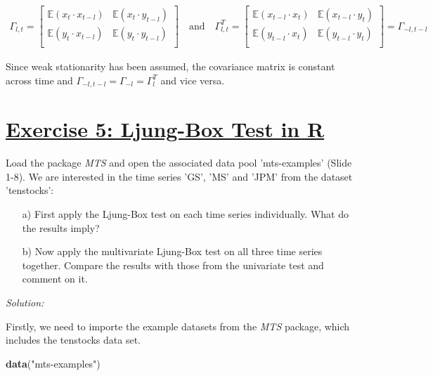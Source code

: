 \documentclass[12pt,a4paper]{article}
\newcommand{\tmpsection}[1]{}
\let\tmpsection=\section
\renewcommand{\section}[1]{\tmpsection{\underline{#1}} }
\newenvironment{Shaded}{\begin{snugshade}}{\end{snugshade}}
\newcommand{\KeywordTok}[1]{\textcolor[rgb]{0.13,0.29,0.53}{\textbf{#1}}}
\newcommand{\NormalTok}[1]{#1}
\newcommand{\StringTok}[1]{\textcolor[rgb]{0.31,0.60,0.02}{#1}}
\begin{document}
\begin{align*}
\Gamma_{l,t} = 
\begin{bmatrix}
  \mathbb{E}(x_t \cdot x_{t-l}) & \mathbb{E}(x_t \cdot y_{t-l}) \\
  \mathbb{E}(y_t \cdot x_{t-l}) & \mathbb{E}(y_t \cdot y_{t-l}) \\
\end{bmatrix}
\quad \text{and} \quad 
\Gamma_{l,t}^{T} = 
\begin{bmatrix}
  \mathbb{E}(x_{t-l} \cdot x_t ) & \mathbb{E}(x_{t-l} \cdot y_t) \\
  \mathbb{E}(y_{t-l} \cdot x_t  ) & \mathbb{E}( y_{t-l} \cdot y_t) \\
\end{bmatrix}
= \Gamma_{-l, t- l}
\end{align*}

Since weak stationarity has been assumed, the covariance matrix is
constant across time and
\(\Gamma_{-l, t- l} = \Gamma_{-l} = \Gamma_{l}^{T}\) and vice versa.

\hypertarget{exercise-5-ljung-box-test-in-r}{%
\section{Exercise 5: Ljung-Box Test in
R}\label{exercise-5-ljung-box-test-in-r}}

Load the package \emph{MTS} and open the associated data pool
'mts-examples' (Slide 1-8). We are interested in the time series 'GS',
'MS' and 'JPM' from the dataset 'tenstocks':

\begin{itemize}
  \item[a)] First apply the Ljung-Box test on each time series individually. What do the results imply?
  \item[b)] Now apply the multivariate Ljung-Box test on all three time series together. Compare the results with those from the univariate test and comment on it.
\end {itemize}

\emph{Solution:}

Firstly, we need to importe the example datasets from the \emph{MTS}
package, which includes the tenstocks data set.

\begin{Shaded}
\begin{Highlighting}[]
\KeywordTok{data}\NormalTok{(}\StringTok{"mts-examples"}\NormalTok{)}
\end{Highlighting}
\end{Shaded}
\end{document}
